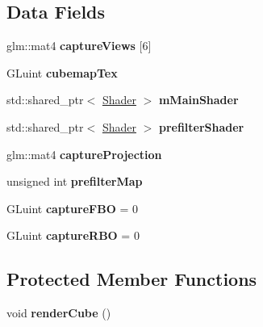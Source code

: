 \subsection*{Data Fields}
\begin{DoxyCompactItemize}
\item 
glm\+::mat4 {\bfseries capture\+Views} \mbox{[}6\mbox{]}\hypertarget{class_cube_map_a6a3a96c080aba0a9d53bcef2751b9438}{}\label{class_cube_map_a6a3a96c080aba0a9d53bcef2751b9438}

\item 
G\+Luint {\bfseries cubemap\+Tex}\hypertarget{class_cube_map_a5e11e5b5c02ab9ad84389aff8658ea05}{}\label{class_cube_map_a5e11e5b5c02ab9ad84389aff8658ea05}

\item 
std\+::shared\+\_\+ptr$<$ \hyperlink{class_shader}{Shader} $>$ {\bfseries m\+Main\+Shader}\hypertarget{class_cube_map_a416152699bb8ddf19cf197c3312348b1}{}\label{class_cube_map_a416152699bb8ddf19cf197c3312348b1}

\item 
std\+::shared\+\_\+ptr$<$ \hyperlink{class_shader}{Shader} $>$ {\bfseries prefilter\+Shader}\hypertarget{class_cube_map_a9c1e5654510e86b23e88b494841aae6c}{}\label{class_cube_map_a9c1e5654510e86b23e88b494841aae6c}

\item 
glm\+::mat4 {\bfseries capture\+Projection}\hypertarget{class_cube_map_ab34edb21a396571e0553010ab60515a3}{}\label{class_cube_map_ab34edb21a396571e0553010ab60515a3}

\item 
unsigned int {\bfseries prefilter\+Map}\hypertarget{class_cube_map_a4d1195dfbe7f487ba2db77f9df9ecdf2}{}\label{class_cube_map_a4d1195dfbe7f487ba2db77f9df9ecdf2}

\item 
G\+Luint {\bfseries capture\+F\+BO} = 0\hypertarget{class_cube_map_a58200802c6b1e11c86b385eb294ddc13}{}\label{class_cube_map_a58200802c6b1e11c86b385eb294ddc13}

\item 
G\+Luint {\bfseries capture\+R\+BO} = 0\hypertarget{class_cube_map_a4bf8bba61b34a4303ce5758c45aa70fc}{}\label{class_cube_map_a4bf8bba61b34a4303ce5758c45aa70fc}

\end{DoxyCompactItemize}
\subsection*{Protected Member Functions}
\begin{DoxyCompactItemize}
\item 
void {\bfseries render\+Cube} ()\hypertarget{class_cube_map_a86364029cd8831d35b1ff11dc16b5d81}{}\label{class_cube_map_a86364029cd8831d35b1ff11dc16b5d81}

\end{DoxyCompactItemize}
